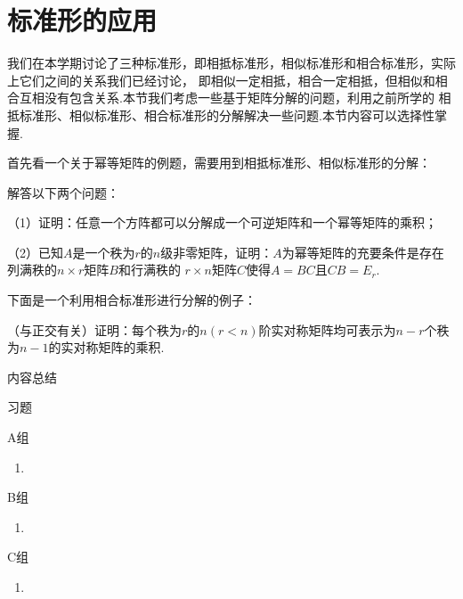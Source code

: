 \section{标准形的应用}
我们在本学期讨论了三种标准形，即相抵标准形，相似标准形和相合标准形，实际上它们之间的关系我们已经讨论，
即相似一定相抵，相合一定相抵，但相似和相合互相没有包含关系.本节我们考虑一些基于矩阵分解的问题，利用之前所学的
相抵标准形、相似标准形、相合标准形的分解解决一些问题.本节内容可以选择性掌握.

首先看一个关于幂等矩阵的例题，需要用到相抵标准形、相似标准形的分解：
\begin{example}
	解答以下两个问题：

	\textup{（1）}证明：任意一个方阵都可以分解成一个可逆矩阵和一个幂等矩阵的乘积\textup{；}
	
	\textup{（2）}已知$A$是一个秩为$r$的$n$级非零矩阵，证明：$A$为幂等矩阵的充要条件是存在列满秩的$n\times r$矩阵$B$和行满秩的
	$r\times n$矩阵$C$使得$A=BC$且$CB=E_r$.
\end{example}
下面是一个利用相合标准形进行分解的例子：
\begin{example}
	（与正交有关）证明：每个秩为$r$的$n(r<n)$阶实对称矩阵均可表示为$n-r$个秩为$n-1$的实对称矩阵的乘积.
\end{example}

\vspace{2ex} 
\centerline{\heiti \Large 内容总结}

\vspace{2ex} 

\centerline{\heiti \Large 习题}
\vspace{2ex} 
{\kaishu }
\begin{flushright}
    \kaishu

\end{flushright}
\centerline{\heiti A组}
\begin{enumerate}
	\item 
\end{enumerate}
\centerline{\heiti B组}
\begin{enumerate}
	\item 
\end{enumerate}
\centerline{\heiti C组}
\begin{enumerate}
	\item 
\end{enumerate}
